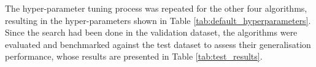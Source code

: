 The hyper-parameter tuning process was repeated for the other four algorithms, resulting in the hyper-parameters shown in Table \ref{tab:default_hyperparameters}. Since the search had been done in the validation dataset, the algorithms were evaluated and benchmarked against the test dataset to assess their generalisation performance, whose results are presented in Table \ref{tab:test_results}.


